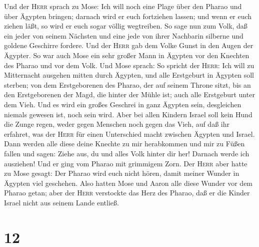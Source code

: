  Und der \textsc{Herr} sprach zu Mose: Ich will noch eine
Plage über den Pharao und über Ägypten bringen; darnach wird er euch
fortziehen lassen; und wenn er euch ziehen läßt, so wird er euch sogar
völlig wegtreiben.  So sage nun zum Volk, daß ein jeder
von seinem Nächsten und eine jede von ihrer Nachbarin silberne und
goldene Geschirre fordere.  Und der \textsc{Herr} gab dem
Volke Gunst in den Augen der Ägypter. So war auch Mose ein sehr großer
Mann in Ägypten vor den Knechten des Pharao und vor dem Volk.
 Und Mose sprach: So spricht der \textsc{Herr}: Ich will
zu Mitternacht ausgehen mitten durch Ägypten,  und alle
Erstgeburt in Ägypten soll sterben; von dem Erstgeborenen des Pharao,
der auf seinem Throne sitzt, bis an den Erstgeborenen der Magd, die
hinter der Mühle ist; auch alle Erstgeburt unter dem Vieh.
 Und es wird ein großes Geschrei in ganz Ägypten sein,
desgleichen niemals gewesen ist, noch sein wird.  Aber bei
allen Kindern Israel soll kein Hund die Zunge regen, weder gegen
Menschen noch gegen das Vieh, auf daß ihr erfahret, was der
\textsc{Herr} für einen Unterschied macht zwischen Ägypten und Israel.
 Dann werden alle diese deine Knechte zu mir herabkommen
und mir zu Füßen fallen und sagen: Ziehe aus, du und alles Volk hinter
dir her! Darnach werde ich ausziehen! Und er ging vom Pharao mit
grimmigem Zorn.  Der \textsc{Herr} aber hatte zu Mose
gesagt: Der Pharao wird euch nicht hören, damit meiner Wunder in Ägypten
viel geschehen.  Also hatten Mose und Aaron alle diese
Wunder vor dem Pharao getan; aber der \textsc{Herr} verstockte das Herz
des Pharao, daß er die Kinder Israel nicht aus seinem Lande entließ.

\hypertarget{section-11}{%
\section{12}\label{section-11}}

